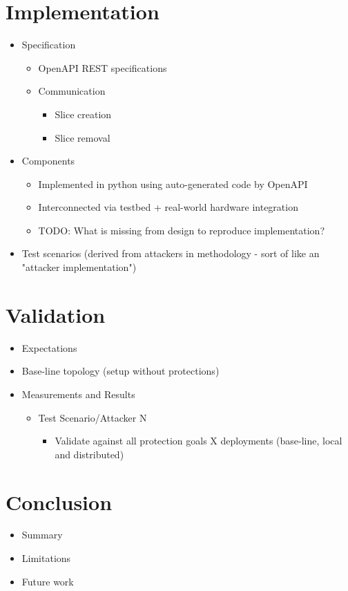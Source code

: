 \documentclass{article}
\begin{document}
\section{Implementation}
\begin{itemize}
    \item Specification
    \begin{itemize}
        \item OpenAPI REST specifications
        \item Communication
        \begin{itemize}
            \item Slice creation
            \item Slice removal
        \end{itemize}
    \end{itemize}
    \item Components
    \begin{itemize}
        \item Implemented in python using auto-generated code by OpenAPI
        \item Interconnected via testbed + real-world hardware integration
        \item TODO: What is missing from design to reproduce implementation?
    \end{itemize}
    \item Test scenarios (derived from attackers in methodology - sort of like an "attacker implementation")
\end{itemize}

\section{Validation} %
\begin{itemize}
    \item Expectations
    \item Base-line topology (setup without protections)
    \item Measurements and Results
    \begin{itemize}
        \item Test Scenario/Attacker N
        \begin{itemize}
            \item Validate against all protection goals X deployments (base-line, local and distributed)
        \end{itemize}
    \end{itemize}
\end{itemize}

\section{Conclusion}
\begin{itemize}
    \item Summary
    \item Limitations
    \item Future work
\end{itemize}

\printbibliography
\end{document}
